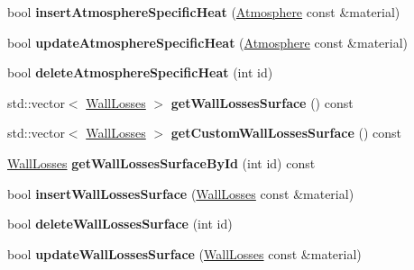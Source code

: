\begin{DoxyCompactItemize}
\item 
\mbox{\label{class_s_q_lite_a5be90371486d63abd80668c19682051b}} 
bool {\bfseries insert\+Atmosphere\+Specific\+Heat} (\hyperlink{class_atmosphere}{Atmosphere} const \&material)
\item 
\mbox{\label{class_s_q_lite_a0980ef2dfdaadb27f86342f983019bb7}} 
bool {\bfseries update\+Atmosphere\+Specific\+Heat} (\hyperlink{class_atmosphere}{Atmosphere} const \&material)
\item 
\mbox{\label{class_s_q_lite_a32f61e2c425864cf222ee427abd33448}} 
bool {\bfseries delete\+Atmosphere\+Specific\+Heat} (int id)
\item 
\mbox{\label{class_s_q_lite_ac385b0462588b7a18349d1621ceac57c}} 
std\+::vector$<$ \hyperlink{class_wall_losses}{Wall\+Losses} $>$ {\bfseries get\+Wall\+Losses\+Surface} () const
\item 
\mbox{\label{class_s_q_lite_aaf414f89916731a94d8c81a98d36987d}} 
std\+::vector$<$ \hyperlink{class_wall_losses}{Wall\+Losses} $>$ {\bfseries get\+Custom\+Wall\+Losses\+Surface} () const
\item 
\mbox{\label{class_s_q_lite_a3a7f473d8e23630dae65cd3c3dd7fa97}} 
\hyperlink{class_wall_losses}{Wall\+Losses} {\bfseries get\+Wall\+Losses\+Surface\+By\+Id} (int id) const
\item 
\mbox{\label{class_s_q_lite_a97d510f6f16aa70c61a9dc6a629ad786}} 
bool {\bfseries insert\+Wall\+Losses\+Surface} (\hyperlink{class_wall_losses}{Wall\+Losses} const \&material)
\item 
\mbox{\label{class_s_q_lite_ab9492a672cb89dfeae330b99ea03ceeb}} 
bool {\bfseries delete\+Wall\+Losses\+Surface} (int id)
\item 
\mbox{\label{class_s_q_lite_ac4b7397ef51a0544d38f670ef995f26e}} 
bool {\bfseries update\+Wall\+Losses\+Surface} (\hyperlink{class_wall_losses}{Wall\+Losses} const \&material)
\item 
\mbox{\label{class_s_q_lite_a654ac1320d5629702346f55f99a648c9}} 

\end{DoxyCompactItemize}
